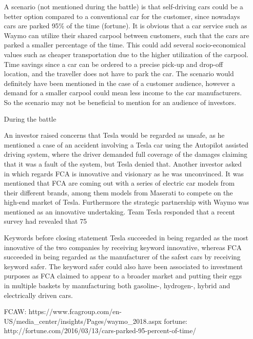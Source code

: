 A scenario (not mentioned during the battle) is that self-driving cars could be a better option compared to a conventional car for the customer, since nowadays cars are parked 95\% of the time (fortune). It is obvious that a car service such as Waymo can utilize their shared carpool between customers, such that the cars are parked a smaller percentage of the time. This could add several socio-economical values such as cheaper transportation due to the higher utilization of the carpool. Time savings since a car can be ordered to a precise pick-up and drop-off location, and the traveller does not have to park the car. The scenario would definitely have been mentioned in the case of a customer audience, however a demand for a smaller carpool could mean less income to the car manufacturers. So the scenario may not be beneficial to mention for an audience of investors.

During the battle

An investor raised concerns that Tesla would be regarded as unsafe, as he mentioned a case of an accident involving a Tesla car using the Autopilot assisted driving system, where the driver demanded full coverage of the damages claiming that it was a fault of the system, but Tesla denied that. Another investor asked in which regards FCA is innovative and visionary as he was unconvinced. It was mentioned that FCA are coming out with a series of electric car models from their different brands, among them models from Maserati to compete on the high-end market of Tesla. Furthermore the strategic partnership with Waymo was mentioned as an innovative undertaking. Team Tesla responded that a recent survey had revealed that 75%

Keywords before closing statement
Tesla succeeded in being regarded as the most innovative of the two companies by receiving keyword innovative, whereas FCA succeeded in being regarded as the manufacturer of the safest cars by receiving keyword safer. The keyword safer could also have been associated to investment purposes as FCA claimed to appear to a broader market and putting their eggs in multiple baskets by manufacturing both gasoline-, hydrogen-, hybrid and electrically driven cars.

FCAW: https://www.fcagroup.com/en-US/media_center/insights/Pages/waymo_2018.aspx
fortune: http://fortune.com/2016/03/13/cars-parked-95-percent-of-time/